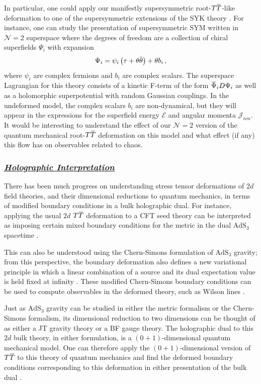 \documentclass[12pt]{article}
\numberwithin{equation}{section}
\newcommand{\ul}{\underline}
\newcommand{\overbar}[1]{\mkern 1.5mu\overline{\mkern-1.5mu#1\mkern-1.5mu}\mkern 1.5mu}
\def\TT{{T\overbar{T}}}
\begin{document}
In particular, one could apply our manifestly supersymmetric root-$\TT$-like deformation to one of the supersymmetric extensions of the SYK theory \cite{Fu:2016vas,Murugan:2017eto,Peng:2017spg}. For instance, one can study the presentation of supersymmetric SYM written in $\mathcal{N} = 2$ superspace \cite{Bulycheva:2018qcp} where the degrees of freedom are a collection of chiral superfields $\Psi_i$ with expansion
\begin{align}
    \Psi_i = \psi_i \left( \tau + \theta \overbar{\theta} \right) + \theta b_i \, , 
\end{align}
%
where $\psi_i$ are complex fermions and $b_i$ are complex scalars. The superspace Lagrangian for this theory consists of a kinetic F-term of the form $\overbar{\Psi}_i D \Psi_i$ as well as a holomorphic superpotential with random Gaussian couplings. In the undeformed model, the complex scalars $b_i$ are non-dynamical, but they will appear in the expressions for the superfield energy $\mathcal{E}$ and angular momenta $\mathcal{J}_{nm}$. It would be interesting to understand the effect of our $\mathcal{N} = 2$ version of the quantum mechanical root-$\TT$ deformation on this model and what effect (if any) this flow has on observables related to chaos.

\subsubsection*{\ul{\it Holographic Interpretation}}

There has been much progress on understanding stress tensor deformations of $2d$ field theories, and their dimensional reductions to quantum mechanics, in terms of modified boundary conditions in a bulk holographic dual. For instance, applying the usual $2d$ $\TT$ deformation to a CFT seed theory can be interpreted as imposing certain mixed boundary conditions for the metric in the dual $\mathrm{AdS}_3$ spacetime \cite{Guica:2019nzm}.

This can also be understood using the Chern-Simons formulation of $\mathrm{AdS}_3$ gravity; from this perspective, the boundary deformation also defines a new variational principle in which a linear combination of a source and its dual expectation value is held fixed at infinity \cite{Llabres:2019jtx}. These modified Chern-Simons boundary conditions can be used to compute observables in the deformed theory, such as Wilson lines \cite{Ebert:2022ehb}.

Just as $\mathrm{AdS}_3$ gravity can be studied in either the metric formalism or the Chern-Simons formalism, its dimensional reduction to two dimensions can be thought of as either a JT gravity theory or a BF gauge theory. The holographic dual to this $2d$ bulk theory, in either formulation, is a $(0+1)$-dimensional quantum mechanical model. One can therefore apply the $(0+1)$-dimensional version of $\TT$ to this theory of quantum mechanics and find the deformed boundary conditions corresponding to this deformation in either presentation of the bulk dual \cite{Ebert:2022ehb}.
\end{document}
